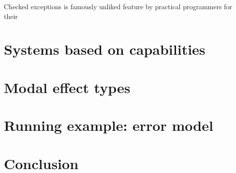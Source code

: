 \documentclass[conference]{IEEEtran}
\begin{document}
    Checked exceptions is famously unliked feature by practical programmers for their










    \section{Systems based on capabilities}




    \section{Modal effect types}



    \section{Running example: error model}



    \section{Conclusion}



%

\end{document}
